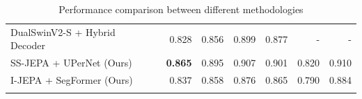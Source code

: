 \begin{table}
\begin{tabular}{lrrrrrr}
		DualSwinV2-S + Hybrid Decoder~\cite{kabir2026dualswinfusionsegmultimodalmartianlandslide}         & 0.828          & 0.856               & 0.899           & 0.877             & -               & -               \\
		SS-JEPA + UPerNet (Ours)                                                                          & \textbf{0.865} & 0.895               & 0.907           & 0.901             & 0.820           & 0.910           \\
		I-JEPA + SegFormer (Ours)                                                                         & 0.837          & 0.858               & 0.876           & 0.865             & 0.790           & 0.884           \\
		\bottomrule                                                                                                                                                                                                        \\
	\end{tabular}
	\vspace{0.5em}
	\caption{Performance comparison between different methodologies}\label{tab:all-vs-ours}
\end{table}

